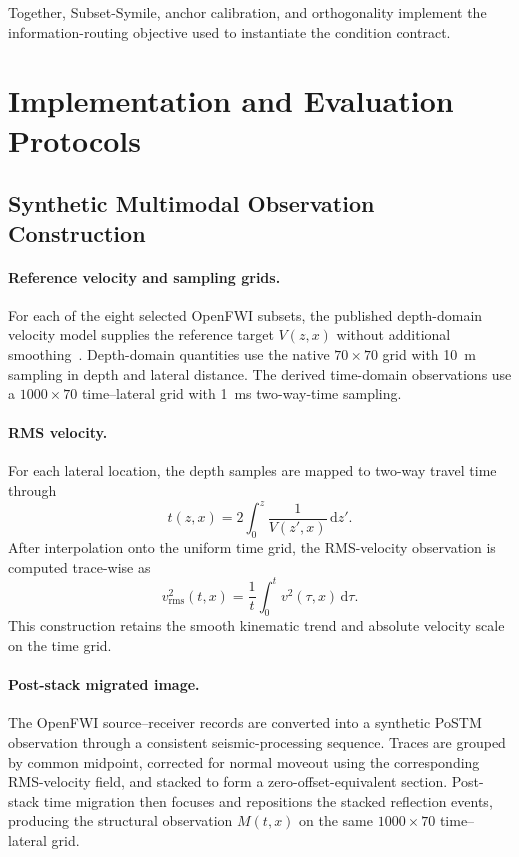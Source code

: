 Together, Subset-Symile, anchor calibration, and orthogonality implement the information-routing objective used to instantiate the condition contract.


\section{Implementation and Evaluation Protocols}
\label{app:implementation}
\subsection{Synthetic Multimodal Observation Construction}
\paragraph{Reference velocity and sampling grids.}
For each of the eight selected OpenFWI subsets, the published depth-domain velocity model supplies the reference target $V(z,x)$ without additional smoothing~\cite{deng2022openfwi}. Depth-domain quantities use the native $70\times70$ grid with 10~m sampling in depth and lateral distance. The derived time-domain observations use a $1000\times70$ time--lateral grid with 1~ms two-way-time sampling.

\paragraph{RMS velocity.}
For each lateral location, the depth samples are mapped to two-way travel time through
\begin{equation}
t(z,x)=2\int_0^z\frac{1}{V(z',x)}\,\mathrm{d}z'.
\label{eq:rms-twt-construction}
\end{equation}
After interpolation onto the uniform time grid, the RMS-velocity observation is computed trace-wise as~\cite{dix1955velocities}
\begin{equation}
v_{\mathrm{rms}}^2(t,x)=\frac{1}{t}\int_0^t v^2(\tau,x)\,\mathrm{d}\tau.
\label{eq:rms-observation-construction}
\end{equation}
This construction retains the smooth kinematic trend and absolute velocity scale on the time grid.

\paragraph{Post-stack migrated image.}
The OpenFWI source--receiver records are converted into a synthetic PoSTM observation through a consistent seismic-processing sequence. Traces are grouped by common midpoint, corrected for normal moveout using the corresponding RMS-velocity field, and stacked to form a zero-offset-equivalent section. Post-stack time migration then focuses and repositions the stacked reflection events, producing the structural observation $M(t,x)$ on the same $1000\times70$ time--lateral grid.


